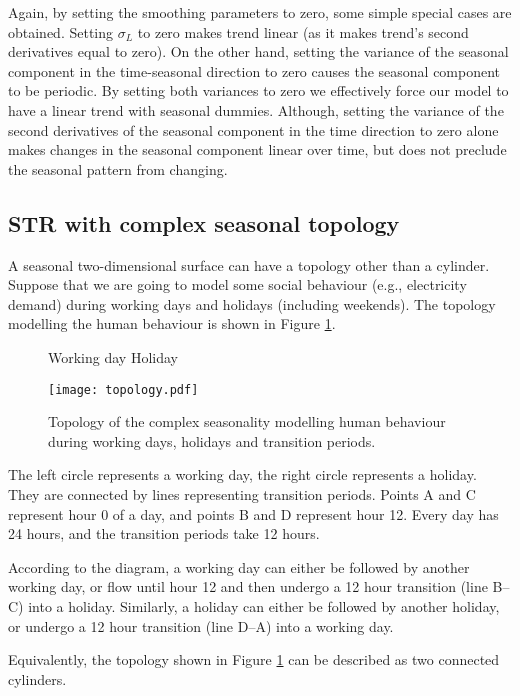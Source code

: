 \documentclass[11pt,a4paper,]{article}
\begin{document}
Again, by setting the smoothing parameters to zero, some simple special cases are obtained.
Setting \(\sigma_L\) to zero makes trend linear (as it makes trend's second derivatives equal to zero). On the other hand, setting the variance of the seasonal component in the time-seasonal direction to zero causes the seasonal component to be periodic. By setting both variances to zero we effectively force our model to have a linear trend with seasonal dummies.
Although, setting the variance of the second derivatives of the seasonal component in the time direction to zero alone makes changes in the seasonal component linear over time, but does not preclude the seasonal pattern from changing.

\hypertarget{sec:complex-topology}{%
\subsection{STR with complex seasonal topology}\label{sec:complex-topology}}

A seasonal two-dimensional surface can have a topology other than a cylinder. Suppose that we are going to model some social behaviour (e.g., electricity demand) during working days and holidays (including weekends). The topology modelling the human behaviour is shown in Figure \ref{fig:topology_pdf}.

\begin{figure}[!hbt]
  \centering
  \centerline{Working day \hspace*{4.5cm} Holiday}
  \texttt{[image: topology.pdf]}
  \caption{Topology of the complex seasonality modelling human behaviour during working days, holidays and transition periods.}
  \label{fig:topology_pdf}
\end{figure}

The left circle represents a working day, the right circle represents a holiday. They are connected by lines representing transition periods. Points A and C represent hour 0 of a day, and points B and D represent hour 12. Every day has 24 hours, and the transition periods take 12 hours.

According to the diagram, a working day can either be followed by another working day, or flow until hour 12 and then undergo a 12 hour transition (line B--C) into a holiday. Similarly, a holiday can either be followed by another holiday, or undergo a 12 hour transition (line D--A) into a working day.

Equivalently, the topology shown in Figure \ref{fig:topology_pdf} can be described as two connected cylinders.
\end{document}
